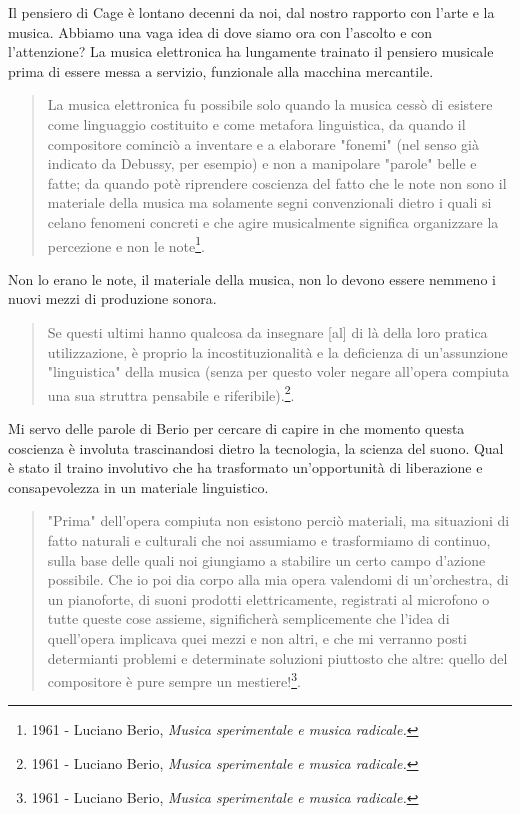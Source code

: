 Il pensiero di Cage è lontano decenni da noi, dal nostro rapporto con l'arte e la
musica. Abbiamo una vaga idea di dove siamo ora con l'ascolto e con l'attenzione? La musica
elettronica ha lungamente trainato il pensiero musicale prima di essere messa a servizio,
funzionale alla macchina mercantile.

\begin{quote}
  La musica elettronica fu possibile solo quando la musica cessò di esistere come
  linguaggio costituito e come metafora linguistica, da quando il compositore
  cominciò a inventare e a elaborare "fonemi" (nel senso già indicato da Debussy, per esempio)
  e non a manipolare "parole" belle e fatte; da quando potè riprendere coscienza
  del fatto che le note non sono il materiale della musica ma solamente segni convenzionali
  dietro i quali si celano fenomeni concreti e che agire musicalmente significa organizzare la
  percezione e non le note\footnote{1961 - Luciano Berio, \emph{Musica sperimentale e musica radicale.}}.
\end{quote}

Non lo erano le note, il materiale della musica, non lo devono essere nemmeno i
nuovi mezzi di produzione sonora.

\begin{quote}
  Se questi ultimi hanno qualcosa da insegnare [al] di là della loro pratica utilizzazione,
  è proprio la incostituzionalità e la deficienza di un'assunzione "linguistica" della musica
  (senza per questo voler negare all'opera compiuta una sua struttra pensabile e
	riferibile).\footnote{1961 - Luciano Berio, \emph{Musica sperimentale e musica radicale.}}.
\end{quote}

Mi servo delle parole di Berio per cercare di capire in che momento questa coscienza
è involuta trascinandosi dietro la tecnologia, la scienza del suono. Qual è stato
il traino involutivo che ha trasformato un'opportunità di liberazione e consapevolezza
in un materiale linguistico.

\begin{quote}
  "Prima" dell'opera compiuta non esistono perciò materiali, ma situazioni di fatto
  naturali e culturali che noi assumiamo e trasformiamo di continuo, sulla base delle
  quali noi giungiamo a stabilire un certo campo d'azione possibile. Che io poi dia
  corpo alla mia opera valendomi di un'orchestra, di un pianoforte, di suoni
  prodotti elettricamente, registrati al microfono o tutte queste cose assieme,
  significherà semplicemente che l'idea di quell'opera implicava quei mezzi
  e non altri, e che mi verranno posti determianti problemi e determinate
  soluzioni piuttosto che altre: quello del compositore è pure sempre un
	mestiere!\footnote{1961 - Luciano Berio, \emph{Musica sperimentale e musica radicale.}}.
\end{quote}

